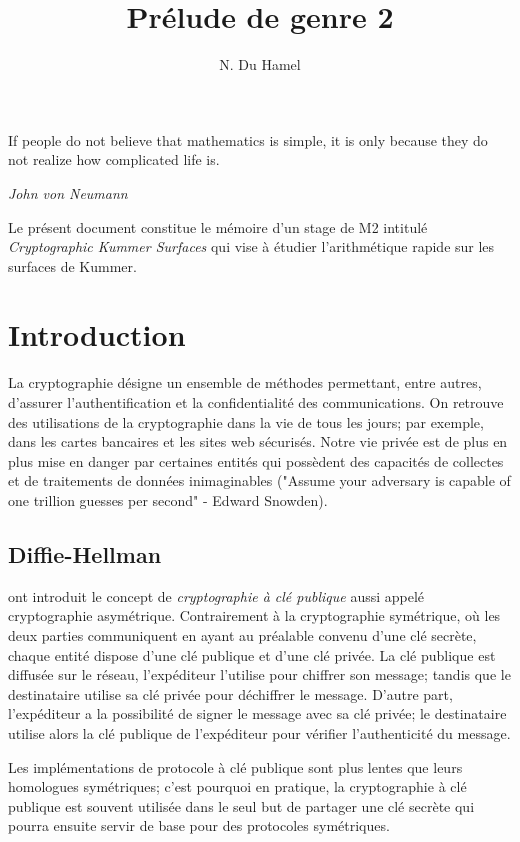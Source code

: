 \documentclass[a4paper]{article}
\theoremstyle{definition}
\theoremstyle{remark}
\numberwithin{equation}{section}
\begin{document}
\title{Prélude de genre 2}
\author{N. Du Hamel}
\maketitle

\epigraph{If people do not believe that mathematics is simple, it is only because they do not realize how complicated life is.}{\textit{John von Neumann}}

Le présent document constitue le mémoire d'un stage de M2 intitulé \emph{Cryptographic Kummer Surfaces} qui vise à étudier l'arithmétique rapide sur les surfaces de Kummer.

\section{Introduction}

La cryptographie désigne un ensemble de méthodes permettant, entre autres, d'assurer l'authentification et la confidentialité des communications. On retrouve des utilisations de la cryptographie dans la vie de tous les jours; par exemple, dans les cartes bancaires et les sites web sécurisés. Notre vie privée est de plus en plus mise en danger par certaines entités qui possèdent des capacités de collectes et de traitements de données inimaginables ("Assume your adversary is capable of one trillion guesses per second" - Edward Snowden).

\subsection{Diffie-Hellman}
\cite{diffie-hellman} ont introduit le concept de \emph{cryptographie à clé publique} aussi appelé cryptographie asymétrique. Contrairement à la cryptographie symétrique, où les deux parties communiquent en ayant au préalable convenu d'une clé secrète, chaque entité dispose d'une clé publique et d'une clé privée. La clé publique est diffusée sur le réseau, l'expéditeur l'utilise pour chiffrer son message; tandis que le destinataire utilise sa clé privée pour déchiffrer le message. D'autre part, l'expéditeur a la possibilité de signer le message avec sa clé privée; le destinataire utilise alors la clé publique de l'expéditeur pour vérifier l'authenticité du message.

Les implémentations de protocole à clé publique sont plus lentes que leurs homologues symétriques; c'est pourquoi en pratique, la cryptographie à clé publique est souvent utilisée dans le seul but de partager une clé secrète qui pourra ensuite servir de base pour des protocoles symétriques.
\end{document}
